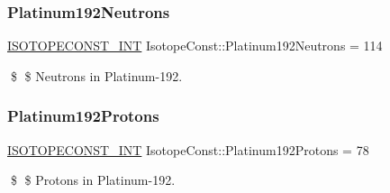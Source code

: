 \subsubsection{\texorpdfstring{Platinum192\+Neutrons}{Platinum192Neutrons}}
{\footnotesize\ttfamily \mbox{\hyperlink{group___isotope_const-_macros_ga5f18360b3e99483a35c32d789e62621c}{I\+S\+O\+T\+O\+P\+E\+C\+O\+N\+S\+T\+\_\+\+I\+NT}} Isotope\+Const\+::\+Platinum192\+Neutrons = 114}

\$ \$ Neutrons in Platinum-\/192. \mbox{\label{group___isotope_const-_platinum-_pt192_ga90ed7a5fb3e2c79c60f74913902179e5}} 
\subsubsection{\texorpdfstring{Platinum192\+Protons}{Platinum192Protons}}
{\footnotesize\ttfamily \mbox{\hyperlink{group___isotope_const-_macros_ga5f18360b3e99483a35c32d789e62621c}{I\+S\+O\+T\+O\+P\+E\+C\+O\+N\+S\+T\+\_\+\+I\+NT}} Isotope\+Const\+::\+Platinum192\+Protons = 78}

\$ \$ Protons in Platinum-\/192. 